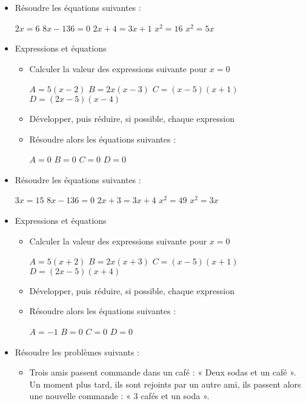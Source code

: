 \begin{itemize}[leftmargin=0.1cm, itemsep=40pt]
\item Résoudre les équations suivantes :

\hfill $2x = 6$ \hfill $8x - 136 = 0$  \hfill $2x + 4 = 3x + 1$
  \hfill $x^2 = 16$   \hfill $x^2 = 5x$  %

\item Expressions et équations
	\begin{itemize}[leftmargin=1cm, itemsep=5pt]
	\item Calculer la valeur des expressions suivante pour $x=0$
		
		\hfill $ A=5(x-2) $ \hfill $ B=2x(x-3) $ \hfill $ C=(x-5)(x+1) $ \hfill $ D=(2x-5)(x-4) $
	\item Développer, puis réduire, si possible, chaque expression
	\item Résoudre alors les équations suivantes :

		\hfill $ A=0 $ \hfill $ B=0 $ \hfill $ C=0 $ \hfill $ D=0 $
	\end{itemize}


\item Résoudre les équations suivantes :

\hfill $3x = 15$ \hfill $8x - 136 = 0$  \hfill $2x + 3 = 3x + 4$
  \hfill $x^2 = 49$   \hfill $x^2 = 3x$  %

\item Expressions et équations
	\begin{itemize}[leftmargin=1cm, itemsep=5pt]
	\item Calculer la valeur des expressions suivante pour $x=0$
		
		\hfill $ A=5(x+2) $ \hfill $ B=2x(x+3) $ \hfill $ C=(x-5)(x+1) $ \hfill $ D=(2x-5)(x+4) $
	\item Développer, puis réduire, si possible, chaque expression
	\item Résoudre alors les équations suivantes :

		\hfill $ A=-1 $ \hfill $ B=0 $ \hfill $ C=0 $ \hfill $ D=0 $
	\end{itemize}


\item Résoudre les problèmes suivants :
	\begin{itemize}[leftmargin=1cm, itemsep=1pt]
		\item 
Trois amis passent commande dans un café : « Deux sodas et un café ».
Un moment plus tard, ils sont rejoints par un autre ami,
ils passent alors une nouvelle commande : « 3 cafés et un soda ».


\end{itemize}
\end{itemize}
